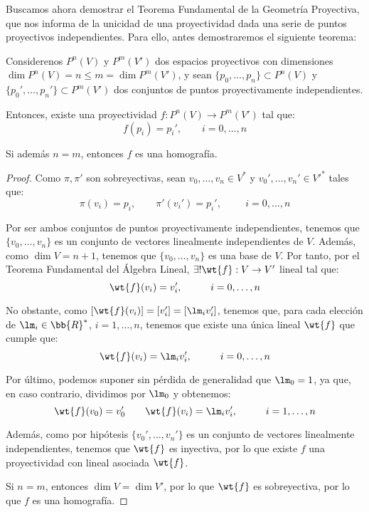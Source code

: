 Buscamos ahora demostrar el Teorema Fundamental de la Geometría Proyectiva, que nos informa de la unicidad de una proyectividad dada una serie de puntos proyectivos independientes.
Para ello, antes demostraremos el siguiente teorema:
\begin{teo}
    Considerenos $P^n(V)$ y $P^m(V')$ dos espacios proyectivos con dimensiones $\dim P^n(V) = n \leq m = \dim P^m(V')$,
    y sean $\{p_0, \dots, p_n\}\subset P^n(V)$ y $\{p_0', \dots, p_n'\}\subset P^m(V')$ dos conjuntos de puntos proyectivamente independientes.

    Entonces, existe una proyectividad $f:P^n(V)\to P^m(V')$ tal que:
    \begin{equation*}
        f(p_i) = p_i',\qquad i=0,\dots,n
    \end{equation*}

    Si además $n = m$, entonces $f$ es una homografía.
\end{teo}
\begin{proof}
    Como $\pi,\pi'$ son sobreyectivas, sean $v_0,\dots,v_n\in V^\ast$ y $v_0',\dots,v_n'\in V'^\ast$ tales que:
    \begin{equation*}
        \pi(v_i) = p_i,\qquad \pi'(v_i') = p_i',\hspace{1cm} i=0,\dots,n
    \end{equation*}

    Por ser ambos conjuntos de puntos proyectivamente independientes, tenemos que $\{v_0,\dots,v_n\}$ es un conjunto de vectores linealmente independientes de $V$.
    Además, como $\dim V = n+1$, tenemos que $\{v_0,\dots,v_n\}$ es una base de $V$. Por tanto, por el Teorema Fundamental del Álgebra Lineal, $\exists! \wt{f}:V\to V'$ lineal tal que:
    \begin{equation*}
        \wt{f}(v_i) = v_i',\hspace{1cm} i=0,\dots,n
    \end{equation*}

    No obstante, como $\left[\wt{f}(v_i)\right] = [v_i'] = [\lm_i v_i']$, tenemos que, para cada elección
    de $\lm_i \in \bb{R}^\ast$, $i=1, \dots, n$, tenemos que existe una única lineal $\wt{f}$ que cumple que:
    \begin{equation*}
        \wt{f}(v_i) = \lm_i v_i',\hspace{1cm} i=0,\dots,n
    \end{equation*}
    
    Por último, podemos suponer sin pérdida de generalidad que $\lm_0 = 1$, ya que, en caso contrario, dividimos por $\lm_0$ y obtenemos:
    \begin{equation*}
        \wt{f}(v_0) = v_0' \qquad \wt{f}(v_i) = \lm_i v_i',\hspace{1cm} i=1,\dots,n
    \end{equation*}

    Además, como por hipótesis $\{v_0',\dots,v_n'\}$ es un conjunto de vectores linealmente independientes,
    tenemos que $\wt{f}$ es inyectiva, por lo que existe $f$ una proyectividad con lineal asociada $\wt{f}$.

    Si $n=m$, entonces $\dim V = \dim V'$, por lo que $\wt{f}$ es sobreyectiva, por lo que $f$ es una homografía.
\end{proof}

